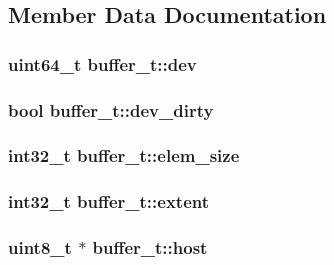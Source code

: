 \subsection{Member Data Documentation}
\hypertarget{structbuffer__t_a6653bc34b20aa7c42bed9807d1111548}{
\subsubsection[{dev}]{\setlength{\rightskip}{0pt plus 5cm}uint64\-\_\-t buffer\-\_\-t\-::dev}}\label{structbuffer__t_a6653bc34b20aa7c42bed9807d1111548}
\hypertarget{structbuffer__t_a6f8e9141729081246d3bfd1e6d1b376a}{
\subsubsection[{dev\-\_\-dirty}]{\setlength{\rightskip}{0pt plus 5cm}bool buffer\-\_\-t\-::dev\-\_\-dirty}}\label{structbuffer__t_a6f8e9141729081246d3bfd1e6d1b376a}
\hypertarget{structbuffer__t_ae161a929ed7ed53425204ddcaf499c63}{
\subsubsection[{elem\-\_\-size}]{\setlength{\rightskip}{0pt plus 5cm}int32\-\_\-t buffer\-\_\-t\-::elem\-\_\-size}}\label{structbuffer__t_ae161a929ed7ed53425204ddcaf499c63}
\hypertarget{structbuffer__t_a8760bb291bb79576c6db5621edd2b4aa}{
\subsubsection[{extent}]{\setlength{\rightskip}{0pt plus 5cm}int32\-\_\-t buffer\-\_\-t\-::extent}}\label{structbuffer__t_a8760bb291bb79576c6db5621edd2b4aa}
\hypertarget{structbuffer__t_a48342b699f70a5399e892dfdfa271191}{
\subsubsection[{host}]{\setlength{\rightskip}{0pt plus 5cm}uint8\-\_\-t $\ast$ buffer\-\_\-t\-::host}}\label{structbuffer__t_a48342b699f70a5399e892dfdfa271191}
